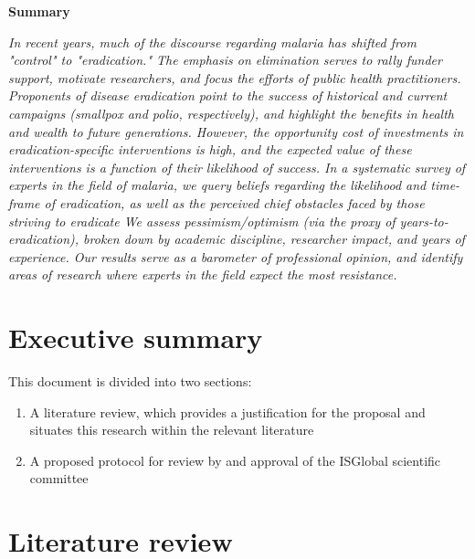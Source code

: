 \documentclass{article}
\begin{document}
\begin{changemargin}{3cm}{3cm} 

\begin{center}
\textbf{Summary}
\end{center}

\emph{In recent years, much of the discourse regarding malaria has shifted from "control" to "eradication." The emphasis on elimination serves to rally funder support, motivate researchers, and focus the efforts of public health practitioners. Proponents of disease eradication point to the success of historical and current campaigns (smallpox and polio, respectively), and highlight the benefits in health and wealth to future generations. However, the opportunity cost of investments in eradication-specific interventions is high, and the expected value of these interventions is a function of their likelihood of success. In a systematic survey of experts in the field of malaria, we query beliefs regarding the likelihood and time-frame of eradication, as well as the perceived chief obstacles faced by those striving to eradicate We assess pessimism/optimism (via the proxy of years-to-eradication), broken down by academic discipline, researcher impact, and years of experience. Our results serve as a barometer of professional opinion, and identify areas of research where experts in the field expect the most resistance.}
\end{changemargin}
\vfill  

\newpage


\section*{Executive summary}

This document is divided into two sections:

\begin{enumerate}
\item A literature review, which provides a justification for the proposal and situates this research within the relevant literature
\item A proposed protocol for review by and approval of the ISGlobal scientific committee
\end{enumerate}



\vspace{5mm}

\tableofcontents


\newpage  
\section*{Literature review}
\end{document}
